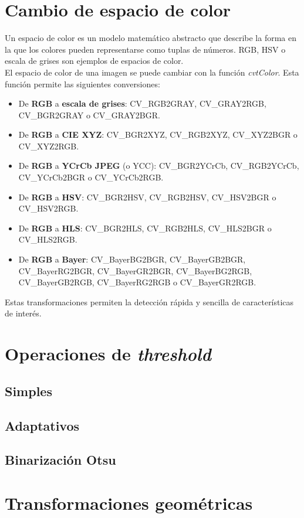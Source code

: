\section{Cambio de espacio de color}
Un espacio de color es un modelo matemático abstracto que describe 
la forma en la que los colores pueden representarse como tuplas de 
números. RGB, HSV o escala de grises son ejemplos de espacios de color. \\
El espacio de color de una imagen se puede cambiar con la función \emph{cvtColor}.
Esta función permite las siguientes conversiones:
\begin{itemize}
\item De \textbf{RGB} a \textbf{escala de grises}: CV_RGB2GRAY, CV_GRAY2RGB, CV_BGR2GRAY 
  o CV_GRAY2BGR\@.
\item De \textbf{RGB} a \textbf{CIE XYZ}: CV_BGR2XYZ, CV_RGB2XYZ, CV_XYZ2BGR o CV_XYZ2RGB\@.
\item De \textbf{RGB} a \textbf{YCrCb JPEG} (o YCC): CV_BGR2YCrCb, CV_RGB2YCrCb, CV_YCrCb2BGR 
  o CV_YCrCb2RGB\@.
\item De \textbf{RGB} a \textbf{HSV}: CV_BGR2HSV, CV_RGB2HSV, CV_HSV2BGR o CV_HSV2RGB\@.
\item De \textbf{RGB} a \textbf{HLS}: CV_BGR2HLS, CV_RGB2HLS, CV_HLS2BGR o CV_HLS2RGB\@.
\item De \textbf{RGB} a \textbf{Bayer}: CV_BayerBG2BGR, CV_BayerGB2BGR, CV_BayerRG2BGR, 
  CV_BayerGR2BGR, CV_BayerBG2RGB, CV_BayerGB2RGB, CV_BayerRG2RGB o CV_BayerGR2RGB\@.
\end{itemize}
Estas transformaciones permiten la detección rápida y sencilla de características
de interés.


\section{Operaciones de \emph{threshold}}
\subsection{Simples}
\subsection{Adaptativos}
\subsection{Binarización Otsu}

\section{Transformaciones geométricas}
